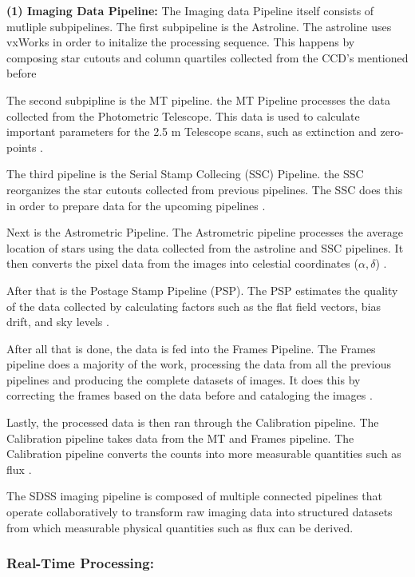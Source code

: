 \documentclass[preprint,linenumbers, longauthor]{aastex631}
\begin{document}
 \textbf{(1) Imaging Data Pipeline:} 
  The Imaging data Pipeline itself consists of mutliple subpipelines. 
  The first subpipeline is the Astroline. The astroline uses vxWorks in order to initalize the processing sequence.
  This happens by composing star cutouts and column quartiles collected from the CCD's mentioned before \cite{luptonSDSSImagingPipelines2001}

  The second subpipline is the MT pipeline. the MT Pipeline processes the data collected from the Photometric Telescope. 
  This data is used to calculate important parameters for the 2.5 m Telescope scans, such as extinction and zero-points \cite{luptonSDSSImagingPipelines2001}.

  The third pipeline is the Serial Stamp Collecing (SSC) Pipeline. the SSC reorganizes the star cutouts collected from previous pipelines.
  The SSC does this in order to prepare data for the upcoming pipelines \cite{luptonSDSSImagingPipelines2001}.

  Next is the Astrometric Pipeline. The Astrometric pipeline processes the average location of stars using the data collected from the astroline and SSC pipelines. 
  It then converts the pixel data from the images into celestial coordinates ($\alpha, \delta$) \cite{luptonSDSSImagingPipelines2001}.

  After that is the Postage Stamp Pipeline (PSP). 
  The PSP estimates the quality of the data collected by calculating factors such as the flat field vectors, bias drift, and sky levels \cite{luptonSDSSImagingPipelines2001}.

  After all that is done, the data is fed into the Frames Pipeline. The Frames pipeline does a majority of the work, processing the data from all the previous pipelines and producing the complete datasets of images.
  It does this by correcting the frames based on the data before and cataloging the images \cite{luptonSDSSImagingPipelines2001}.

  Lastly, the processed data is then ran through the Calibration pipeline. The Calibration pipeline takes data from the MT and Frames pipeline. The Calibration pipeline converts the counts into more measurable quantities such as flux \cite{luptonSDSSImagingPipelines2001}.

The SDSS imaging pipeline is composed of multiple connected pipelines that operate collaboratively to transform raw imaging data into structured datasets from which measurable physical quantities such as flux can be derived.

  \subsubsection{Real-Time Processing:} 
\end{document}
